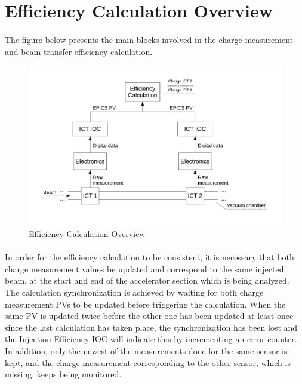 \documentclass[openany]{article}
\begin{document}
\section{Efficiency Calculation Overview}

	\paragraph{} The figure below presents the main blocks involved in the charge measurement and beam transfer efficiency calculation.

	\begin{figure}[!h]
		\caption{Efficiency Calculation Overview}
		\label{fig:eff-calc-overview}
		\centering
		\includegraphics[width=1.0\textwidth]{eff-calc-overview-image}
	\end{figure}
\FloatBarrier

	\paragraph{} In order for the efficiency calculation to be consistent, it is necessary that both charge measurement values be updated and correspond to the same injected beam, at the start and end of the accelerator section which is being analyzed. The calculation synchronization is achieved by waiting for both charge measurement PVs to be updated before triggering the calculation. When the same PV is updated twice before the other one has been updated at least once since the last calculation has taken place, the synchronization has been lost and the Injection Efficiency IOC will indicate this by incrementing an error counter. In addition, only the newest of the measurements done for the same sensor is kept, and the charge measurement corresponding to the other sensor, which is missing, keeps being monitored.
\end{document}
